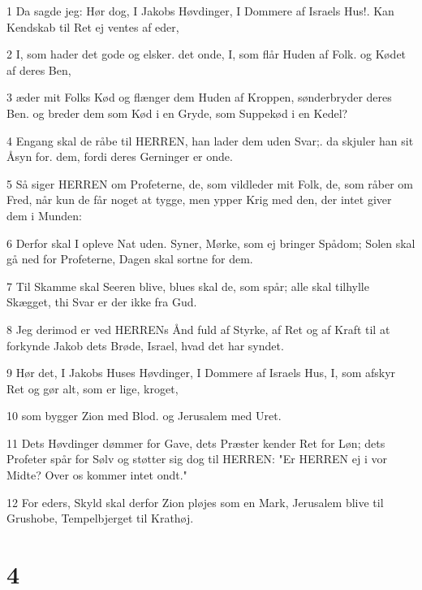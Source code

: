 \par 1 Da sagde jeg: Hør dog, I Jakobs Høvdinger, I Dommere af Israels Hus!. Kan Kendskab til Ret ej ventes af eder,
\par 2 I, som hader det gode og elsker. det onde, I, som flår Huden af Folk. og Kødet af deres Ben,
\par 3 æder mit Folks Kød og flænger dem Huden af Kroppen, sønderbryder deres Ben. og breder dem som Kød i en Gryde, som Suppekød i en Kedel?
\par 4 Engang skal de råbe til HERREN, han lader dem uden Svar;. da skjuler han sit Åsyn for. dem, fordi deres Gerninger er onde.
\par 5 Så siger HERREN om Profeterne, de, som vildleder mit Folk, de, som råber om Fred, når kun de får noget at tygge, men ypper Krig med den, der intet giver dem i Munden:
\par 6 Derfor skal I opleve Nat uden. Syner, Mørke, som ej bringer Spådom; Solen skal gå ned for Profeterne, Dagen skal sortne for dem.
\par 7 Til Skamme skal Seeren blive, blues skal de, som spår; alle skal tilhylle Skægget, thi Svar er der ikke fra Gud.
\par 8 Jeg derimod er ved HERRENs Ånd fuld af Styrke, af Ret og af Kraft til at forkynde Jakob dets Brøde, Israel, hvad det har syndet.
\par 9 Hør det, I Jakobs Huses Høvdinger, I Dommere af Israels Hus, I, som afskyr Ret og gør alt, som er lige, kroget,
\par 10 som bygger Zion med Blod. og Jerusalem med Uret.
\par 11 Dets Høvdinger dømmer for Gave, dets Præster kender Ret for Løn; dets Profeter spår for Sølv og støtter sig dog til HERREN: "Er HERREN ej i vor Midte? Over os kommer intet ondt."
\par 12 For eders, Skyld skal derfor Zion pløjes som en Mark, Jerusalem blive til Grushobe, Tempelbjerget til Krathøj.

\chapter{4}

